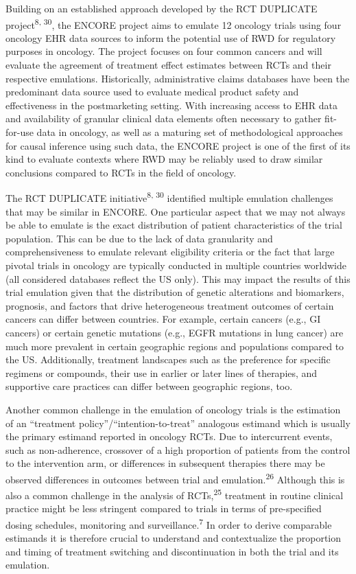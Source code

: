 \documentclass[
  letterpaper,
  DIV=11,
  numbers=noendperiod]{scrartcl}
\begin{document}
Building on an established approach developed by the RCT DUPLICATE
project\textsuperscript{8, 30}, the ENCORE project aims to emulate 12
oncology trials using four oncology EHR data sources to inform the
potential use of RWD for regulatory purposes in oncology. The project
focuses on four common cancers and will evaluate the agreement of
treatment effect estimates between RCTs and their respective emulations.
Historically, administrative claims databases have been the predominant
data source used to evaluate medical product safety and effectiveness in
the postmarketing setting. With increasing access to EHR data and
availability of granular clinical data elements often necessary to
gather fit-for-use data in oncology, as well as a maturing set of
methodological approaches for causal inference using such data, the
ENCORE project is one of the first of its kind to evaluate contexts
where RWD may be reliably used to draw similar conclusions compared to
RCTs in the field of oncology.

The RCT DUPLICATE initiative\textsuperscript{8, 30} identified multiple
emulation challenges that may be similar in ENCORE. One particular
aspect that we may not always be able to emulate is the exact
distribution of patient characteristics of the trial population. This
can be due to the lack of data granularity and comprehensiveness to
emulate relevant eligibility criteria or the fact that large pivotal
trials in oncology are typically conducted in multiple countries
worldwide (all considered databases reflect the US only). This may
impact the results of this trial emulation given that the distribution
of genetic alterations and biomarkers, prognosis, and factors that drive
heterogeneous treatment outcomes of certain cancers can differ between
countries. For example, certain cancers (e.g., GI cancers) or certain
genetic mutations (e.g., EGFR mutations in lung cancer) are much more
prevalent in certain geographic regions and populations compared to the
US. Additionally, treatment landscapes such as the preference for
specific regimens or compounds, their use in earlier or later lines of
therapies, and supportive care practices can differ between geographic
regions, too.

Another common challenge in the emulation of oncology trials is the
estimation of an ``treatment policy''/``intention-to-treat'' analogous
estimand which is usually the primary estimand reported in oncology
RCTs. Due to intercurrent events, such as non-adherence, crossover of a
high proportion of patients from the control to the intervention arm, or
differences in subsequent therapies there may be observed differences in
outcomes between trial and emulation.\textsuperscript{26} Although this
is also a common challenge in the analysis of RCTs,\textsuperscript{25}
treatment in routine clinical practice might be less stringent compared
to trials in terms of pre-specified dosing schedules, monitoring and
surveillance.\textsuperscript{7} In order to derive comparable estimands
it is therefore crucial to understand and contextualize the proportion
and timing of treatment switching and discontinuation in both the trial
and its emulation.
\end{document}
